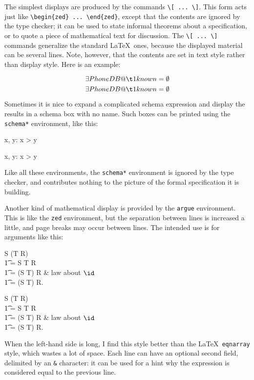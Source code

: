 The simplest displays are produced by the commands
\verb/\[ ... \]/.\index{|\[ ... \]|} This form acts just
like \verb/\begin{zed} ... \end{zed}/, except that the contents are
ignored by the type checker; it can be used to state informal
theorems about a specification, or to quote a piece of mathematical
text for discussion. The \verb/\[ ... \]/ commands generalize the
standard \LaTeX\ ones, because the displayed material can be several
lines.  Note, however, that the contents are set in text style
rather than display style.  Here is an example:
\begin{demo}
\[
    \exists PhoneDB @ \\
\t1     known = \emptyset
\]       
\gives
\[
    \exists PhoneDB @ \\
\t1     known = \emptyset
\]       
\end{demo}

\def\schemastar{{\tt schema*}}
Sometimes it is nice to expand a complicated schema expression and
display the results in a schema box with no name.  Such boxes can be
printed using the \verb/schema*/ environment, like
this:\index{\schemastar\ environment}
\begin{demo}
\begin{schema*}
        x, y: \nat
\where
        x > y
\end{schema*}
\gives
\begin{schema*}
        x, y: \nat
\where
        x > y
\end{schema*}
\end{demo}
Like all these environments, the \verb/schema*/ environment is
ignored by the type checker, and contributes nothing to the picture
of the formal specification it is building.

Another kind of mathematical display is provided by the \verb/argue/
environment.  This is like the \verb/zed/
environment, but the separation between lines is increased a little,
and page breaks may occur between lines.  The intended use is for
arguments like this:
\begin{demo}
\begin{argue}
    S \dres (T \dres R) \\
\t1     = \id S \comp \id T \comp R \\
\t1     = \id (S \cap T) \comp R & law about $\id$ \\
\t1     = (S \cap T) \dres R.
\end{argue}
\gives
\begin{argue}
    S \dres (T \dres R) \\
\t1     = \id S \comp \id T \comp R \\
\t1     = \id (S \cap T) \comp R & law about $\id$ \\
\t1     = (S \cap T) \dres R.
\end{argue}
\end{demo}
When the left-hand side is long, I find this style better than the
\LaTeX\ \verb/eqnarray/ style, which wastes a lot of space. 
Each line can have an optional second field, delimited by an
\verb/&/ character: it can be used for a hint why the expression is
considered equal to the previous line.

